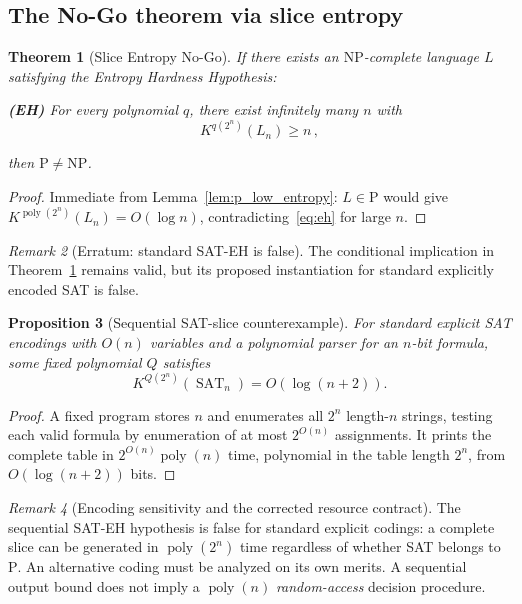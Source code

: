 \documentclass[aps,prd,twocolumn,superscriptaddress,nofootinbib]{revtex4-2}
\newtheorem{theorem}{Theorem}[section]
\newtheorem{proposition}[theorem]{Proposition}
\theoremstyle{definition}
\theoremstyle{remark}
\newtheorem{remark}[theorem]{Remark}
\DeclareMathOperator{\poly}{poly}
\DeclareMathOperator{\SAT}{SAT}
\newcommand{\NP}{\mathrm{NP}}
\newcommand{\PP}{\mathrm{P}}
\begin{document}
\subsection{The No-Go theorem via slice entropy}

\begin{theorem}[Slice Entropy No-Go]
\label{thm:slice_nogo}
If there exists an $\NP$-complete language $L$ satisfying the \textit{Entropy Hardness Hypothesis}:

\textbf{(EH)} For every polynomial $q$, there exist infinitely many $n$ with
\begin{equation}
K^{q(2^n)}(L_n) \geq n\,,
\label{eq:eh}
\end{equation}

then $\PP \neq \NP$.
\end{theorem}

\begin{proof}
Immediate from Lemma~\ref{lem:p_low_entropy}: $L \in \PP$ would give $K^{\poly(2^n)}(L_n) = O(\log n)$, contradicting~\eqref{eq:eh} for large $n$.
\end{proof}

\begin{remark}[Erratum: standard SAT-EH is false]
The conditional implication in Theorem~\ref{thm:slice_nogo} remains valid,
but its proposed instantiation for standard explicitly encoded SAT is false.
\end{remark}
\begin{proposition}[Sequential SAT-slice counterexample]
\label{prop:sat-slice-counterexample}
For standard explicit SAT encodings with $O(n)$ variables and a polynomial
parser for an $n$-bit formula, some fixed polynomial $Q$ satisfies
\[
K^{Q(2^n)}(\SAT_n)=O(\log(n+2)).
\]
\end{proposition}
\begin{proof}
A fixed program stores $n$ and enumerates all $2^n$ length-$n$ strings,
testing each valid formula by enumeration of at most $2^{O(n)}$
assignments. It prints the complete table in $2^{O(n)}\poly(n)$ time,
polynomial in the table length $2^n$, from $O(\log(n+2))$ bits.
\end{proof}

\begin{remark}[Encoding sensitivity and the corrected resource contract]
\label{rem:encoding}
The sequential SAT-EH hypothesis is false for standard explicit codings:
a complete slice can be generated in $\poly(2^n)$ time regardless
of whether SAT belongs to $\PP$. An alternative coding must be analyzed
on its own merits. A sequential output bound does not imply a
$\poly(n)$ \emph{random-access} decision procedure.
\end{remark}
\end{document}
